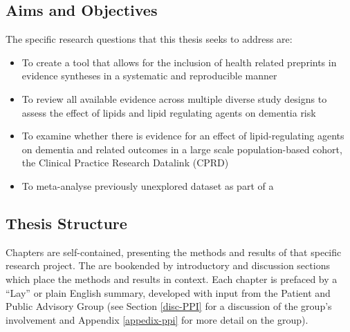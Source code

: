 \documentclass[a4paper,nobind]{templates/ociamthesis}
\providecommand{\tightlist}{%
  \setlength{\itemsep}{0pt}\setlength{\parskip}{0pt}}
\begin{document}
\hypertarget{aims-and-objectives}{%
\subsection{Aims and Objectives}\label{aims-and-objectives}}

The specific research questions that this thesis seeks to address are:

\begin{itemize}
\tightlist
\item
  To create a tool that allows for the inclusion of health related preprints in evidence syntheses in a systematic and reproducible manner
\item
  To review all available evidence across multiple diverse study designs to assess the effect of lipids and lipid regulating agents on dementia risk
\item
  To examine whether there is evidence for an effect of lipid-regulating agents on dementia and related outcomes in a large scale population-based cohort, the Clinical Practice Research Datalink (CPRD)
\item
  To meta-analyse previously unexplored dataset as part of a
\end{itemize}

\hypertarget{thesis-structure}{%
\subsection{Thesis Structure}\label{thesis-structure}}

Chapters are self-contained, presenting the methods and results of that specific research project. The are bookended by introductory and discussion sections which place the methods and results in context. Each chapter is prefaced by a ``Lay'' or plain English summary, developed with input from the Patient and Public Advisory Group (see Section \ref{disc-PPI} for a discussion of the group's involvement and Appendix \ref{appedix-ppi} for more detail on the group).
\end{document}
